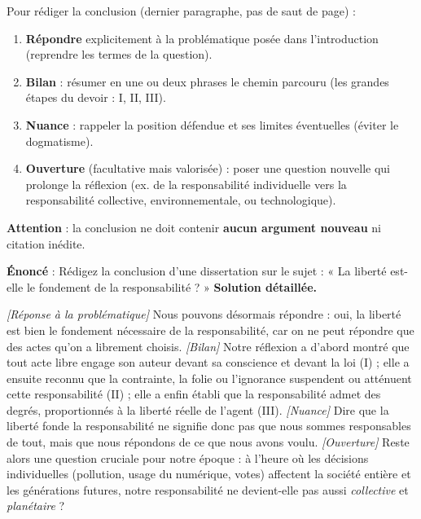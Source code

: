 \documentclass[11pt]{article}
\begin{document}
\begin{methode}
Pour rédiger la conclusion (dernier paragraphe, pas de saut de page) :
\begin{enumerate}
\item \textbf{Répondre} explicitement à la problématique posée dans l'introduction (reprendre les termes de la question).
\item \textbf{Bilan} : résumer en une ou deux phrases le chemin parcouru (les grandes étapes du devoir : I, II, III).
\item \textbf{Nuance} : rappeler la position défendue et ses limites éventuelles (éviter le dogmatisme).
\item \textbf{Ouverture} (facultative mais valorisée) : poser une question nouvelle qui prolonge la réflexion (ex. de la responsabilité individuelle vers la responsabilité collective, environnementale, ou technologique).
\end{enumerate}
\textbf{Attention} : la conclusion ne doit contenir \textbf{aucun argument nouveau} ni citation inédite.
\end{methode}

\begin{exoresolu}
\textbf{Énoncé} : Rédigez la conclusion d'une dissertation sur le sujet : « La liberté est-elle le fondement de la responsabilité ? »
\tcblower
\textbf{Solution détaillée.}

\textit{[Réponse à la problématique]} Nous pouvons désormais répondre : oui, la liberté est bien le fondement nécessaire de la responsabilité, car on ne peut répondre que des actes qu'on a librement choisis. \textit{[Bilan]} Notre réflexion a d'abord montré que tout acte libre engage son auteur devant sa conscience et devant la loi (I) ; elle a ensuite reconnu que la contrainte, la folie ou l'ignorance suspendent ou atténuent cette responsabilité (II) ; elle a enfin établi que la responsabilité admet des degrés, proportionnés à la liberté réelle de l'agent (III). \textit{[Nuance]} Dire que la liberté fonde la responsabilité ne signifie donc pas que nous sommes responsables de tout, mais que nous répondons de ce que nous avons voulu. \textit{[Ouverture]} Reste alors une question cruciale pour notre époque : à l'heure où les décisions individuelles (pollution, usage du numérique, votes) affectent la société entière et les générations futures, notre responsabilité ne devient-elle pas aussi \emph{collective} et \emph{planétaire} ?
\end{exoresolu}
\end{document}
